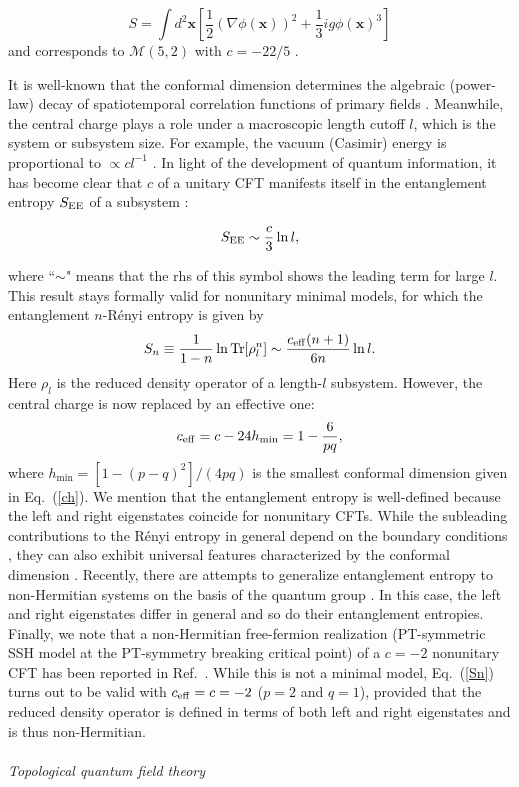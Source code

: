 \documentclass{tADP2e}
\theoremstyle{plain}
\newcommand{\eqn}[1]{
\begin{eqnarray}
	#1
\end{eqnarray}
}
\theoremstyle{plain}
\theoremstyle{definition}
\begin{document}
{\begin{equation}
S=\int d^2\boldsymbol{x}\left[\frac{1}{2}(\nabla\phi(\boldsymbol{x}))^2%
+\frac{1}{3}ig\phi(\boldsymbol{x})^3\right]\label{iphi3}
\end{equation}}
and corresponds to $\mathcal{M}(5,2)$ with $c=-22/5$ \cite{CJL85}. 


It is well-known that the conformal dimension determines the algebraic (power-law) decay of spatiotemporal correlation functions of primary fields \cite{AAB84}. Meanwhile, the central charge plays a role under a {macroscopic} length cutoff $l$, which is the system or subsystem size. For example, the vacuum (Casimir) energy is proportional to $\propto cl^{-1}$ \cite{BHWJ86}. In light of the development of quantum information, it has become clear that $c$ of a unitary CFT manifests itself in the entanglement entropy $S_{\rm EE}$ of a subsystem \cite{PC04}:
\eqn{S_{\rm EE}\sim\frac{c}{3}\ln l,\label{EEcc}
}
where ``$\sim$" means that the rhs of this symbol shows the leading term for large $l$. 
This result stays formally valid for nonunitary minimal models, for which the entanglement $n$-R\'enyi entropy is given by \cite{DB15}
\begin{equation}
S_n\equiv\frac{1}{1-n}\ln{\rm Tr}[\rho_l^n]\sim\frac{c_{\rm eff}(n+1)}{6n}\ln l.%
\label{Sn}
\end{equation}
Here $\rho_l$ is the reduced density operator of a length-$l$ subsystem. However, the central charge is now replaced by an effective one:
\begin{equation}
c_{\rm eff}=c-24h_{\min}=1-\frac{6}{pq},
\end{equation} 
where $h_{\min}=[1-(p-q)^2]/(4pq)$ is the smallest conformal dimension given in Eq.~(\ref{ch}). We mention that the entanglement entropy is well-defined because the left and right eigenstates coincide for nonunitary CFTs. While the subleading contributions to the R\'enyi entropy in general depend on the boundary conditions \cite{JC10}, they can also exhibit universal features characterized by the conformal dimension \cite{OK15}. 
Recently, there are attempts to generalize entanglement entropy to non-Hermitian systems  on the basis of the quantum group \cite{KC072,CR2017}. In this case, the left and right eigenstates differ in general and so do their entanglement entropies. Finally, we note that a non-Hermitian free-fermion realization (PT-symmetric SSH model at the PT-symmetry breaking critical point) of a $c=-2$ nonunitary CFT has been reported in Ref.~\cite{PYC19}. While this is not a minimal model, Eq.~(\ref{Sn}) turns out to be valid with $c_{\rm eff}=c=-2$ ($p=2$ and $q=1$), provided that the reduced density operator is defined in terms of both left and right eigenstates and is thus non-Hermitian.
\\ \\ {\it Topological quantum field theory}
\end{document}
